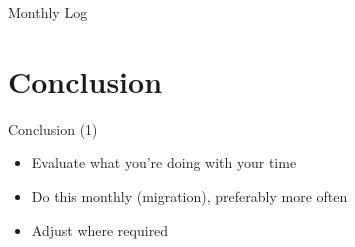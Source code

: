 \documentclass[aspectratio=169]{beamer}
\begin{document}
    {
    \begin{frame}{Monthly Log}
    \end{frame}
    }

    \section{Conclusion}

    {
    \begin{frame}{Conclusion (1)}
        \begin{itemize}
            \item Evaluate what you're doing with your time
            \item Do this monthly (migration), preferably more often
            \item Adjust where required
        \end{itemize}
    \end{frame}
    }
\end{document}
